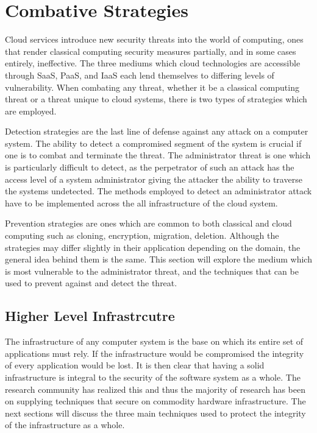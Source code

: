 \section{Combative Strategies}
\label{overview}

Cloud services introduce new security threats into the world of computing, ones that render classical computing security measures partially, and in some cases entirely, ineffective. The three mediums which cloud technologies are accessible through SaaS, PaaS, and IaaS each lend themselves to differing levels of vulnerability.\cite{theoharidou}\cite{subashini} When combating any threat, whether it be a classical computing threat or a threat unique to cloud systems, there is two types of strategies which are employed.

Detection strategies are the last line of defense against any attack on a computer system. The ability to detect a compromised segment of the system is crucial if one is to combat and terminate the threat. The administrator threat is one which is particularly difficult to detect, as the perpetrator of such an attack has the access level of a system administrator giving the attacker the ability to traverse the systems undetected. The methods employed to detect an administrator attack have to be implemented across the all infrastructure of the cloud system.\cite{dawoud}

Prevention strategies are ones which are common to both classical and cloud computing such as cloning, encryption, migration, deletion. Although the strategies may differ slightly in their application depending on the domain, the general idea behind them is the same.
This section will explore the medium which is most vulnerable to the administrator threat, and the techniques that can be used to prevent against and detect the threat.


\subsection{Higher Level Infrastrcutre}
\label{hlInfrastructure}

The infrastructure of any computer system is the base on which its entire set of applications must rely. If the infrastructure would be compromised the integrity of every application would be lost. \cite{dawoud} It is then clear that having a solid infrastructure is integral to the security of the software system as a whole. The research community has realized this and thus the majority of research has been on supplying techniques that secure on commodity hardware infrastructure. The next sections will discuss the three main techniques used to protect the integrity of the infrastructure as a whole.

